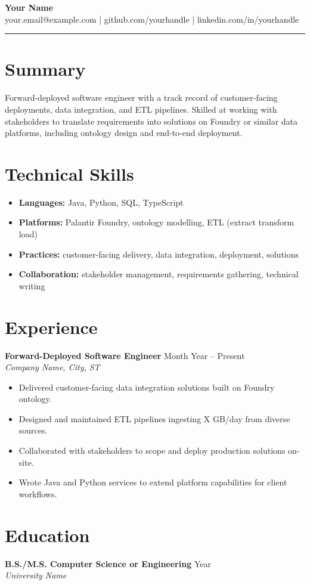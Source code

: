 \documentclass[11pt,letterpaper]{article}
\begin{document}
{\Large \textbf{Your Name}} \\
your.email@example.com \quad | \quad github.com/yourhandle \quad | \quad linkedin.com/in/yourhandle

\bigskip
\hrule
\bigskip

\section*{Summary}
Forward-deployed software engineer with a track record of customer-facing deployments,
data integration, and ETL pipelines. Skilled at working with stakeholders to translate
requirements into solutions on Foundry or similar data platforms, including ontology design
and end-to-end deployment.

\section*{Technical Skills}
\begin{itemize}[leftmargin=*]
  \item \textbf{Languages:} Java, Python, SQL, TypeScript
  \item \textbf{Platforms:} Palantir Foundry, ontology modelling, ETL (extract transform load)
  \item \textbf{Practices:} customer-facing delivery, data integration, deployment, solutions
  \item \textbf{Collaboration:} stakeholder management, requirements gathering, technical writing
\end{itemize}

\section*{Experience}

\textbf{Forward-Deployed Software Engineer} \hfill Month Year -- Present \\
\textit{Company Name, City, ST}
\begin{itemize}[leftmargin=*]
  \item Delivered customer-facing data integration solutions built on Foundry ontology.
  \item Designed and maintained ETL pipelines ingesting X GB/day from diverse sources.
  \item Collaborated with stakeholders to scope and deploy production solutions on-site.
  \item Wrote Java and Python services to extend platform capabilities for client workflows.
\end{itemize}

\section*{Education}
\textbf{B.S./M.S. Computer Science or Engineering} \hfill Year \\
\textit{University Name}
\end{document}
